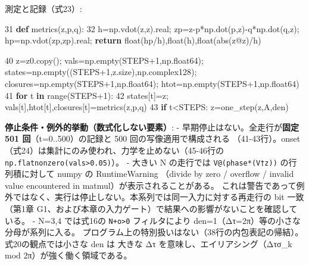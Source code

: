 \documentclass[
  a4paper,
]{ltjsarticle}
\newenvironment{Shaded}{}{}
\newcommand{\BuiltInTok}[1]{\textcolor[rgb]{0.00,0.50,0.00}{#1}}
\newcommand{\ControlFlowTok}[1]{\textcolor[rgb]{0.00,0.44,0.13}{\textbf{#1}}}
\newcommand{\DecValTok}[1]{\textcolor[rgb]{0.25,0.63,0.44}{#1}}
\newcommand{\KeywordTok}[1]{\textcolor[rgb]{0.00,0.44,0.13}{\textbf{#1}}}
\newcommand{\NormalTok}[1]{#1}
\newcommand{\OperatorTok}[1]{\textcolor[rgb]{0.40,0.40,0.40}{#1}}
\begin{document}
測定と記録（式23）:

\begin{Shaded}
\begin{Highlighting}[]
    \DecValTok{31}  \KeywordTok{def}\NormalTok{ metrics(z,p,q):}
    \DecValTok{32}\NormalTok{      h}\OperatorTok{=}\NormalTok{np.vdot(z,z).real}\OperatorTok{;}\NormalTok{ zp}\OperatorTok{=}\NormalTok{z}\OperatorTok{{-}}\NormalTok{p}\OperatorTok{*}\NormalTok{np.dot(p,z)}\OperatorTok{{-}}\NormalTok{q}\OperatorTok{*}\NormalTok{np.dot(q,z)}\OperatorTok{;}\NormalTok{ hp}\OperatorTok{=}\NormalTok{np.vdot(zp,zp).real}\OperatorTok{;} \ControlFlowTok{return} \BuiltInTok{float}\NormalTok{(hp}\OperatorTok{/}\NormalTok{h),}\BuiltInTok{float}\NormalTok{(h),}\BuiltInTok{float}\NormalTok{(}\BuiltInTok{abs}\NormalTok{(z}\OperatorTok{@}\NormalTok{z)}\OperatorTok{/}\NormalTok{h)}
\end{Highlighting}
\end{Shaded}

\begin{Shaded}
\begin{Highlighting}[]
    \DecValTok{40}\NormalTok{          z}\OperatorTok{=}\NormalTok{z0.copy()}\OperatorTok{;}\NormalTok{ vals}\OperatorTok{=}\NormalTok{np.empty(STEPS}\OperatorTok{+}\DecValTok{1}\NormalTok{,np.float64)}\OperatorTok{;}\NormalTok{ states}\OperatorTok{=}\NormalTok{np.empty((STEPS}\OperatorTok{+}\DecValTok{1}\NormalTok{,z.size),np.complex128)}\OperatorTok{;}\NormalTok{ closures}\OperatorTok{=}\NormalTok{np.empty(STEPS}\OperatorTok{+}\DecValTok{1}\NormalTok{,np.float64)}\OperatorTok{;}\NormalTok{ htot}\OperatorTok{=}\NormalTok{np.empty(STEPS}\OperatorTok{+}\DecValTok{1}\NormalTok{,np.float64)}
    \DecValTok{41}          \ControlFlowTok{for}\NormalTok{ t }\KeywordTok{in} \BuiltInTok{range}\NormalTok{(STEPS}\OperatorTok{+}\DecValTok{1}\NormalTok{):}
    \DecValTok{42}\NormalTok{              states[t]}\OperatorTok{=}\NormalTok{z}\OperatorTok{;}\NormalTok{ vals[t],htot[t],closures[t]}\OperatorTok{=}\NormalTok{metrics(z,p,q)}
    \DecValTok{43}              \ControlFlowTok{if}\NormalTok{ t}\OperatorTok{\textless{}}\NormalTok{STEPS: z}\OperatorTok{=}\NormalTok{one\_step(z,A,den)}
\end{Highlighting}
\end{Shaded}

\textbf{停止条件・例外的挙動（数式化しない要素）}: -
早期停止はない。全走行が\textbf{固定 501 回}（t=0..500）の記録と 500
回の写像適用で構成される
（41-43行）。onset（式24）は集計にのみ使われ、力学を止めない（45-46行の
\texttt{np.flatnonzero(vals\textgreater{}0.05)}）。 - 大きい N
の走行では \texttt{V@(phase*(V†z))} の行列積に対して numpy の
RuntimeWarning （divide by zero / overflow / invalid value encountered
in matmul）が表示されることがある。
これは警告であって例外ではなく、実行は停止しない。本系列では同一入力に対する再走行の
bit 一致（第1章
G1、および本章の入力ゲート）で結果への影響がないことを確認している。 -
N=3,4 では式16の \texttt{N+o\textgreater{}0} フィルタにより
den=1（Δτ=2π）等の小さな分母が系列に入る。
プログラム上の特別扱いはない（38行の内包表記の帰結）。式20の観点では小さな
den は 大きな Δτ を意味し、エイリアシング（Δτσ\_k mod
2π）が強く働く領域である。
\end{document}
